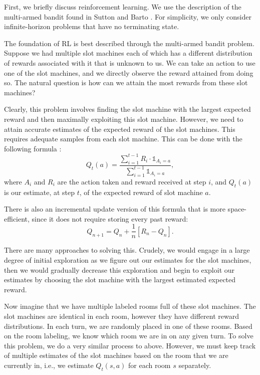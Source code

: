 \documentclass{article}
\begin{document}
First, we briefly discuss reinforcement learning. We use the description of the multi-armed bandit found in Sutton and Barto \citep{suttonbarto2018}. For simplicity, we only consider infinite-horizon problems that have no terminating state.

The foundation of RL is best described through the multi-armed bandit problem. Suppose we had multiple slot machines each of which has a different distribution of rewards associated with it that is unknown to us. We can take an action to use one of the slot machines, and we directly observe the reward attained from doing so. The natural question is how can we attain the most rewards from these slot machines?

Clearly, this problem involves finding the slot machine with the largest expected reward and then maximally exploiting this slot machine. However, we need to attain accurate estimates of the expected reward of the slot machines. This requires adequate samples from each slot machine. This can be done with the following formula \citep{suttonbarto2018}:
\begin{equation}
Q_t(a) = \frac{\sum_{i=1}^{t-1} R_i \cdot \mathbb{1}_{A_i = a}}{\sum_{i=1}^{t-1} \mathbb{1}_{A_i = a}},
\end{equation}
where $A_i$ and $R_i$ are the action taken and reward received at step $i$, and $Q_t(a)$ is our estimate, at step $t$, of the expected reward of slot machine $a$.

There is also an incremental update version of this formula that is more space-efficient, since it does not require storing every past reward:
\begin{equation}
Q_{n+1} = Q_n + \frac{1}{n}\left[R_n - Q_n\right].
\end{equation}

There are many approaches to solving this. Crudely, we would engage in a large degree of initial exploration as we figure out our estimates for the slot machines, then we would gradually decrease this exploration and begin to exploit our estimates by choosing the slot machine with the largest estimated expected reward.

Now imagine that we have multiple labeled rooms full of these slot machines. The slot machines are identical in each room, however they have different reward distributions. In each turn, we are randomly placed in one of these rooms. Based on the room labeling, we know which room we are in on any given turn. To solve this problem, we do a very similar process to above. However, we must keep track of multiple estimates of the slot machines based on the room that we are currently in, i.e., we estimate $Q_t(s,a)$ for each room $s$ separately.
\end{document}
